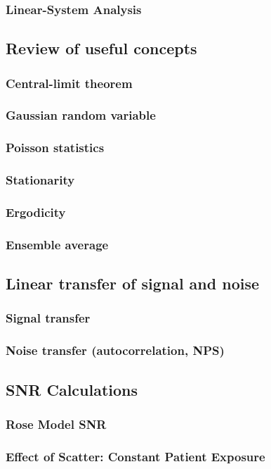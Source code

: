 \documentclass[11pt]{article}
\begin{document}
\subsubsection{Linear-System Analysis}
\subsection{Review of useful concepts}
\subsubsection{Central-limit theorem}
\subsubsection{Gaussian random variable}
\subsubsection{Poisson statistics}
\subsubsection{Stationarity}
\subsubsection{Ergodicity}
\subsubsection{Ensemble average}
\subsection{Linear transfer of signal and noise}
\subsubsection{Signal transfer}
\subsubsection{Noise transfer (autocorrelation, NPS)}
\subsection{SNR Calculations}
\subsubsection{Rose Model SNR}
\subsubsection{Effect of Scatter: Constant Patient Exposure}
\end{document}
